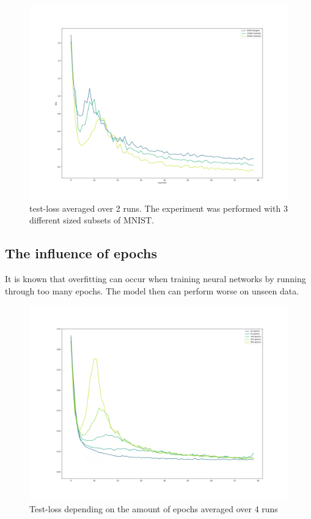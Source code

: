 \begin{figure}[!htp]
\centering
\includegraphics[width= 1\linewidth]{Abschlussarbeit_2021/LaTeX/images/diff_samplesizes.png}
\caption{test-loss averaged over 2 runs. The experiment was performed with 3 different sized subsets of MNIST.}
\label{fig:sample_size_double_descent}
\end{figure}



\subsection{The influence of epochs}


It is known that overfitting can occur when training neural networks by running through too many epochs. The model then can perform worse on unseen data.   



\begin{figure}[!htp]
\centering
\includegraphics[width= 1\linewidth]{Abschlussarbeit_2021/LaTeX/images/many_epochs.png}
\caption{Test-loss depending on the amount of epochs averaged over 4 runs}
\label{fig:epochs_double_descent}
\end{figure}


